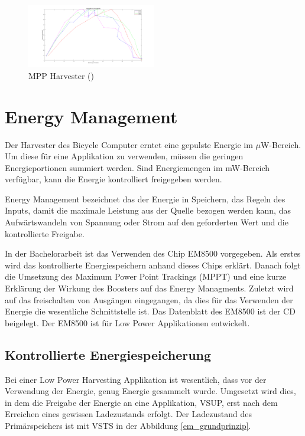 \begin{figure}[ht]
   \includegraphics[width=0.5\textwidth]{2TheoretischeGrundlagen/imag/MPPHarvester.png}
   \caption{MPP Harvester (\cite{MPP_Harv})}
   \label{bild_harvester} 
\end{figure}


\section{Energy Management}\label{t_energy_management} 

Der Harvester des Bicycle Computer erntet eine gepulste Energie im $\mu$W-Bereich. Um diese für eine Applikation zu verwenden, müssen die geringen Energieportionen summiert werden. Sind Energiemengen im mW-Bereich verfügbar, kann die Energie kontrolliert freigegeben werden.

Energy Management bezeichnet das der Energie in Speichern, das Regeln des Inputs, damit die maximale Leistung aus der Quelle bezogen werden kann, das Aufwärtswandeln von Spannung oder Strom auf den geforderten Wert und die kontrollierte Freigabe.

In der Bachelorarbeit ist das Verwenden des Chip EM8500 vorgegeben. Als erstes wird das kontrollierte Energiespeichern anhand dieses Chips erklärt. Danach folgt die Umsetzung des Maximum Power Point Trackings (MPPT) und eine kurze Erklärung der Wirkung des Boosters auf das Energy Managments. Zuletzt wird auf das freischalten von Ausgängen eingegangen, da dies für das Verwenden der Energie die wesentliche Schnittstelle ist. Das Datenblatt des EM8500 ist der CD beigelegt. Der EM8500 ist für Low Power Applikationen entwickelt.

\subsection{Kontrollierte Energiespeicherung}

Bei einer Low Power Harvesting Applikation ist wesentlich, dass vor der Verwendung der Energie, genug Energie gesammelt wurde. Umgesetzt wird dies, in dem die Freigabe der Energie an eine Applikation, VSUP, erst nach dem Erreichen eines gewissen Ladezustands erfolgt. Der Ladezustand des Primärspeichers ist mit VSTS in der Abbildung \ref{em_grundprinzip}.

